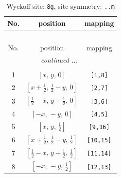 \documentclass[fleqn,8pt]{jsarticle}
\begin{document}
\begin{longtable}{ccc}
\caption{Wyckoff site: {\tt 8g}, site symmetry: {\tt ..m}}
 \\
 \hline \hline
No. & position & mapping \\ \hline \endfirsthead

\multicolumn{2}{l}{\tablename\ \thetable{}} \\
 \hline \hline
No. & position & mapping \\ \hline \endhead

 \hline \hline
\multicolumn{2}{r}{\footnotesize\it continued ...} \\ \endfoot

 \hline \hline
\multicolumn{2}{r}{} \\ \endlastfoot

1 & $\left[ x,\, y,\, 0 \right]$ & {\tt [1,8]} \\ \hline
2 & $\left[ x + \frac{1}{2},\, \frac{1}{2} - y,\, 0 \right]$ & {\tt [2,7]} \\ \hline
3 & $\left[ \frac{1}{2} - x,\, y + \frac{1}{2},\, 0 \right]$ & {\tt [3,6]} \\ \hline
4 & $\left[ - x,\, - y,\, 0 \right]$ & {\tt [4,5]} \\ \hline
5 & $\left[ x,\, y,\, \frac{1}{2} \right]$ & {\tt [9,16]} \\ \hline
6 & $\left[ x + \frac{1}{2},\, \frac{1}{2} - y,\, \frac{1}{2} \right]$ & {\tt [10,15]} \\ \hline
7 & $\left[ \frac{1}{2} - x,\, y + \frac{1}{2},\, \frac{1}{2} \right]$ & {\tt [11,14]} \\ \hline
8 & $\left[ - x,\, - y,\, \frac{1}{2} \right]$ & {\tt [12,13]} \\
\end{longtable}
\renewcommand{\arraystretch}{1.2}
\end{document}

